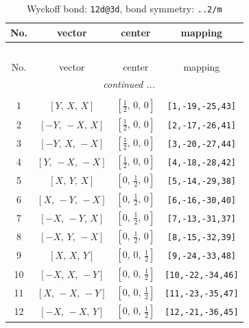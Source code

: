 \documentclass[fleqn,8pt]{jsarticle}
\begin{document}
\begin{longtable}{cccc}
\caption{Wyckoff bond: {\tt 12d@3d}, bond symmetry: {\tt ..2/m}}
 \\
 \hline \hline
No. & vector & center & mapping \\ \hline \endfirsthead

\multicolumn{3}{l}{\tablename\ \thetable{}} \\
 \hline \hline
No. & vector & center & mapping \\ \hline \endhead

 \hline \hline
\multicolumn{3}{r}{\footnotesize\it continued ...} \\ \endfoot

 \hline \hline
\multicolumn{3}{r}{} \\ \endlastfoot

1 & $\left[ Y,\, X,\, X \right]$ & $\left[ \frac{1}{2},\, 0,\, 0 \right]$ & {\tt [1,-19,-25,43]} \\ \hline
2 & $\left[ - Y,\, - X,\, X \right]$ & $\left[ \frac{1}{2},\, 0,\, 0 \right]$ & {\tt [2,-17,-26,41]} \\ \hline
3 & $\left[ - Y,\, X,\, - X \right]$ & $\left[ \frac{1}{2},\, 0,\, 0 \right]$ & {\tt [3,-20,-27,44]} \\ \hline
4 & $\left[ Y,\, - X,\, - X \right]$ & $\left[ \frac{1}{2},\, 0,\, 0 \right]$ & {\tt [4,-18,-28,42]} \\ \hline
5 & $\left[ X,\, Y,\, X \right]$ & $\left[ 0,\, \frac{1}{2},\, 0 \right]$ & {\tt [5,-14,-29,38]} \\ \hline
6 & $\left[ X,\, - Y,\, - X \right]$ & $\left[ 0,\, \frac{1}{2},\, 0 \right]$ & {\tt [6,-16,-30,40]} \\ \hline
7 & $\left[ - X,\, - Y,\, X \right]$ & $\left[ 0,\, \frac{1}{2},\, 0 \right]$ & {\tt [7,-13,-31,37]} \\ \hline
8 & $\left[ - X,\, Y,\, - X \right]$ & $\left[ 0,\, \frac{1}{2},\, 0 \right]$ & {\tt [8,-15,-32,39]} \\ \hline
9 & $\left[ X,\, X,\, Y \right]$ & $\left[ 0,\, 0,\, \frac{1}{2} \right]$ & {\tt [9,-24,-33,48]} \\ \hline
10 & $\left[ - X,\, X,\, - Y \right]$ & $\left[ 0,\, 0,\, \frac{1}{2} \right]$ & {\tt [10,-22,-34,46]} \\ \hline
11 & $\left[ X,\, - X,\, - Y \right]$ & $\left[ 0,\, 0,\, \frac{1}{2} \right]$ & {\tt [11,-23,-35,47]} \\ \hline
12 & $\left[ - X,\, - X,\, Y \right]$ & $\left[ 0,\, 0,\, \frac{1}{2} \right]$ & {\tt [12,-21,-36,45]} \\
\end{longtable}
\end{document}
